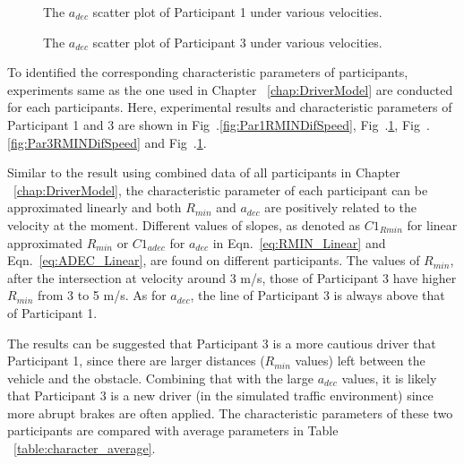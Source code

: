 \begin{figure}[htbp!]
\begin{center}
\end{center}
\caption{The $a_{dec}$ scatter plot of Participant 1 under various velocities.}
\label{fig:Par1ADECDifSpeed} 
\end{figure}

\begin{figure}[htbp!]
\begin{center}
\end{center}
\caption{The $a_{dec}$ scatter plot of Participant 3 under various velocities.}
\label{fig:Par3ADECDifSpeed} 
\end{figure}

To identified the corresponding characteristic parameters of participants, experiments same as the one used in Chapter ~\ref{chap:DriverModel} are conducted for each participants. Here, experimental results and characteristic parameters of Participant 1 and 3 are shown in Fig~.\ref{fig:Par1RMINDifSpeed}, Fig~.\ref{fig:Par1ADECDifSpeed}, Fig~.\ref{fig:Par3RMINDifSpeed} and Fig~.\ref{fig:Par1ADECDifSpeed}. 

Similar to the result using combined data of all participants in Chapter ~\ref{chap:DriverModel}, the characteristic parameter of each participant can be approximated linearly and both $R_{min}$ and $a_{dec}$ are positively related to the velocity at the moment. Different values of slopes, as denoted as ${C1}_{Rmin}$ for linear approximated $R_{min}$ or ${C1}_{adec}$ for $a_{dec}$ in Eqn.~\ref{eq:RMIN_Linear} and Eqn.~\ref{eq:ADEC_Linear}, are found on different participants. The values of $R_{min}$, after the intersection at velocity around 3 m/s, those of Participant 3 have higher $R_{min}$ from 3 to 5 m/s. As for $a_{dec}$, the line of Participant 3 is always above that of Participant 1. 

The results can be suggested that Participant 3 is a more cautious driver that Participant 1, since there are larger distances ($R_{min}$ values) left between the vehicle and the obstacle. Combining that with the large $a_{dec}$ values, it is likely that Participant 3 is a new driver (in the simulated traffic environment) since more abrupt brakes are often applied. The characteristic parameters of these two participants are compared with average parameters in Table ~\ref{table:character_average}.

